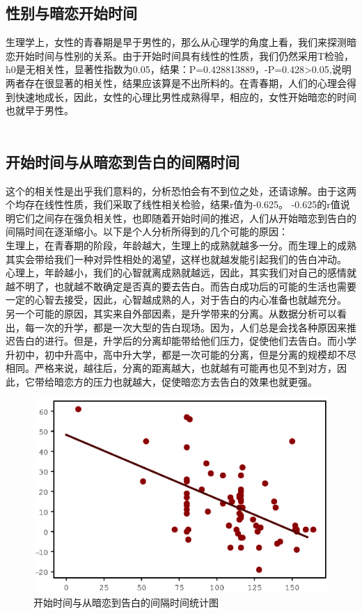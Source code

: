 \documentclass[10pt, a4paper, twocolumn]{ctexart}
\begin{document}
\subsection{性别与暗恋开始时间}
生理学上，女性的青春期是早于男性的，那么从心理学的角度上看，我们来探测暗恋开始时间与性别的关系。由于开始时间具有线性的性质，我们仍然采用T检验，h0是无相关性，显著性指数为0.05，结果：P=0.428813889，-P=0.428>0.05,说明两者存在很显著的相关性，结果应该算是不出所料的。在青春期，人们的心理会得到快速地成长，因此，女性的心理比男性成熟得早，相应的，女性开始暗恋的时间也就早于男性。\\\\
\subsection{开始时间与从暗恋到告白的间隔时间}
这个的相关性是出乎我们意料的，分析恐怕会有不到位之处，还请谅解。由于这两个均存在线性性质，我们采取了线性相关检验，结果r值为-0.625。
\indent -0.625的r值说明它们之间存在强负相关性，也即随着开始时间的推迟，人们从开始暗恋到告白的间隔时间在逐渐缩小。以下是个人分析所得到的几个可能的原因：\\
\indent 生理上，在青春期的阶段，年龄越大，生理上的成熟就越多一分。而生理上的成熟其实会带给我们一种对异性相处的渴望，这样也就越发能引起我们的告白冲动。\\
心理上，年龄越小，我们的心智就离成熟就越远，因此，其实我们对自己的感情就越不明了，也就越不敢确定是否真的要去告白。而告白成功后的可能的生活也需要一定的心智去接受，因此，心智越成熟的人，对于告白的内心准备也就越充分。\\
\indent 另一个可能的原因，其实来自外部因素，是升学带来的分离。从数据分析可以看出，每一次的升学，都是一次大型的告白现场。因为，人们总是会找各种原因来推迟告白的进行。但是，升学后的分离却能带给他们压力，促使他们去告白。而小学升初中，初中升高中，高中升大学，都是一次可能的分离，但是分离的规模却不尽相同。严格来说，越往后，分离的距离越大，也就越有可能再也见不到对方，因此，它带给暗恋方的压力也就越大，促使暗恋方去告白的效果也就更强。\\
\begin{figure}[htbp]
	\centering
	\label{l0}
	\includegraphics[width = 0.8\linewidth]{l0.eps}
	\caption{开始时间与从暗恋到告白的间隔时间统计图} %
\end{figure}
\\
\end{document}
